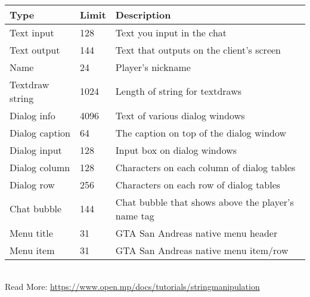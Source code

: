 \documentclass{article}
\begin{document}
\\\begin{tabular}{ |l|l|l| } 
\hline
Type & Limit & Description \\
\hline
Text input & 128 & Text you input in the chat \\
Text output & 144 & Text that outputs on the client's screen \\
Name & 24 & Player's nickname \\
Textdraw string & 1024 & Length of string for textdraws \\
Dialog info & 4096 & Text of various dialog windows \\
Dialog caption & 64 & The caption on top of the dialog window \\
Dialog input & 128 & Input box on dialog windows \\
Dialog column & 128 & Characters on each column of dialog tables \\
Dialog row & 256 & Characters on each row of dialog tables \\
Chat bubble & 144 & Chat bubble that shows above the player's name tag \\
Menu title & 31 & GTA San Andreas native menu header \\
Menu item & 31 & GTA San Andreas native menu item/row \\
\hline
\end{tabular}
\bigskip
\\Read More: \url{https://www.open.mp/docs/tutorials/stringmanipulation}
\end{document}

